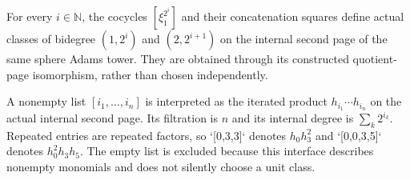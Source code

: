 \begin{definition}
  \label{def:milnor-internal-hi-family}
  \leanok
  For every $i\in\mathbb N$, the cocycles $[\xi_1^{2^i}]$ and their
  concatenation squares define actual classes of bidegree $(1,2^i)$ and
  $(2,2^{i+1})$ on the internal second page of the same sphere Adams tower.
  They are obtained through its constructed quotient-page isomorphism,
  rather than chosen independently.
\end{definition}

\begin{definition}
  \label{def:milnor-h-word-product}
  \leanok
  A nonempty list $[i_1,\ldots,i_n]$ is interpreted as the iterated
  product $h_{i_1}\cdots h_{i_n}$ on the actual internal second page. Its
  filtration is $n$ and its internal degree is
  $\sum_k 2^{i_k}$. Repeated entries are repeated factors, so `[0,3,3]`
  denotes $h_0h_3^2$ and `[0,0,3,5]` denotes $h_0^2h_3h_5$.
  The empty list is excluded because this interface describes nonempty
  monomials and does not silently choose a unit class.
\end{definition}

